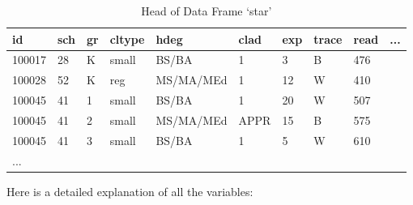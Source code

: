 \documentclass{article}
\begin{document}
\begin{table}[h]
    \centering
    \caption{Head of Data Frame ‘star’}
    \label{table:data}
    \begin{tabular}{|l|l|l|l|l|l|l|l|l|l|}
    \hline
    id     & sch & gr & cltype & hdeg      & clad & exp & trace & read & ... \\ \hline
    100017 & 28  & K  & small  & BS/BA     & 1    & 3   & B     & 476  &     \\ \hline
    100028 & 52  & K  & reg    & MS/MA/MEd & 1    & 12  & W     & 410  &     \\ \hline
    100045 & 41  & 1  & small  & BS/BA     & 1    & 20  & W     & 507  &     \\ \hline
    100045 & 41  & 2  & small  & MS/MA/MEd & APPR & 15  & B     & 575  &     \\ \hline
    100045 & 41  & 3  & small  & BS/BA     & 1    & 5   & W     & 610  &     \\ \hline
    ...    &     &    &        &           &      &     &       &      &     \\ \hline
    \end{tabular}
\end{table}

Here is a detailed explanation of all the variables:
\end{document}
